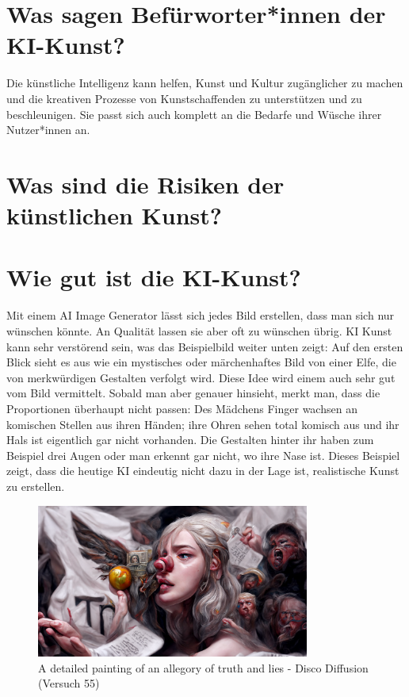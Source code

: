 \documentclass{article}
\begin{document}
\section{Was sagen Befürworter*innen der KI-Kunst?}
    Die künstliche Intelligenz kann helfen, Kunst und Kultur zugänglicher zu machen und die kreativen 
    Prozesse von Kunstschaffenden zu unterstützen und zu beschleunigen.  Sie passt sich auch komplett 
    an die Bedarfe und Wüsche ihrer Nutzer*innen an.

\section{Was sind die Risiken der künstlichen Kunst?}


\section{Wie gut ist die KI-Kunst?}
    Mit einem AI Image Generator lässt sich jedes Bild erstellen, dass man sich nur wünschen könnte. 
    An Qualität lassen sie aber oft zu wünschen übrig. 
    KI Kunst kann sehr verstörend sein, was das Beispielbild weiter unten zeigt: Auf den ersten Blick sieht es aus wie ein mystisches oder 
    märchenhaftes Bild von einer Elfe, die von merkwürdigen Gestalten verfolgt wird. Diese Idee wird einem 
    auch sehr gut vom Bild vermittelt. Sobald man aber genauer hinsieht, merkt man, dass die Proportionen
    überhaupt nicht passen: Des Mädchens Finger wachsen an komischen Stellen aus ihren Händen; ihre Ohren 
    sehen total komisch aus und ihr Hals ist eigentlich gar nicht vorhanden. Die Gestalten hinter ihr haben 
    zum Beispiel drei Augen oder man erkennt gar nicht, wo ihre Nase ist. Dieses Beispiel zeigt, dass die 
    heutige KI eindeutig nicht dazu in der Lage ist, realistische Kunst zu erstellen.
    \begin{figure}[ht]
    \centering
    \includegraphics[width=0.8\textwidth]{ki-bild.png} 
    \caption{A detailed painting of an allegory of truth and lies - Disco Diffusion (Versuch 55)}
    \label{fig:ki-bild}
    \end{figure}
    
\end{document}
